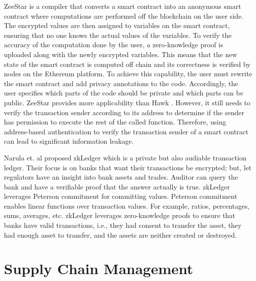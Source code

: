ZeeStar \cite{ZeeStar} is a compiler that converts a smart contract into an anonymous smart contract where computations are performed off the blockchain on the user side. The encrypted values are then assigned to variables on the smart contract, ensuring that no one knows the actual values of the variables. To verify the accuracy of the computation done by the user, a zero-knowledge proof is uploaded along with the newly encrypted variables. This means that the new state of the smart contract is computed off chain and its correctness is verified by nodes on the Ethereum platform. To achieve this capability, the user must rewrite the smart contract and add privacy annotations to the code. Accordingly, the user specifies which parts of the code should be private and which parts can be public. 
ZeeStar \cite{ZeeStar} provides more applicability than Hawk \cite{Hawk}. However, it still needs to verify the transaction sender according to its address to determine if the sender has permission to execute the rest of the called function. Therefore, using address-based authentication to verify the transaction sender of a smart contract can lead to significant information leakage. 

Narula et. al \cite{zkLedger2018} proposed zkLedger which is a private but also audiable transaction ledger. Their focus is on banks that want their transactions be encrypted; but, let regulators have an insight into bank assets and trades. Auditor can query the bank and have a verifiable proof that the answer actually is true. zkLedger leverages Peterson commitment \cite{petersen1997convert} for committing values. Peterson commitment enables linear functions over transaction values. For example, ratios, percentages, sums, averages, etc. zkLedger leverages zero-knowledge proofs to ensure that banks have valid transactions, i.e., they had consent to transfer the asset, they had enough asset to transfer, and the assets are neither created or destroyed.

\section{Supply Chain Management} \label{sec:lit_SCM}


